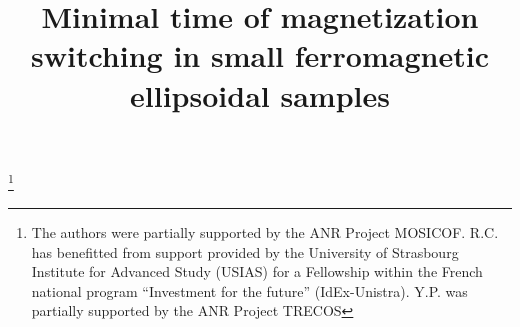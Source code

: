 \documentclass[JEP,XML,SOM,Unicode,NoEqCountersInSection,NoFloatCountersInSection,published]{cedram}
\theoremstyle{definition}
\begin{document}
\frontmatter

\title{Minimal time of magnetization switching in small ferromagnetic ellipsoidal samples}

\author[\initial{R.} \lastname{Côte}]{ }
\address{IRMA, Université de Strasbourg, CNRS UMR 7501, Inria,\\
7 rue René Descartes, 67084 Strasbourg, France\\
\& University of Strasbourg Institute for Advanced Study (USIAS)}

\author[\initial{C.} \lastname{Courtès}]{ }
\address{IRMA, Université de Strasbourg, CNRS UMR 7501, Inria,\\
7 rue René Descartes, 67084 Strasbourg, France}

\author[\initial{G.} \lastname{Ferrière}]{\nobreakauthor {}}
\address{IRMA, Université de Strasbourg, CNRS UMR 7501, Inria,\\
7 rue René Descartes, 67084 Strasbourg, France}

\author[\initial{Y.} \lastname{Privat}]{ }
\address{Université de Lorraine, CNRS, Institut Elie Cartan de Lorraine, Inria,\\
BP 70239 54506 Vandœuvre-lès-Nancy Cedex, France\\
\& Institut Universitaire de France (IUF)}

\thanks{The authors were partially supported by the ANR Project MOSICOF. R.C. has benefitted from support provided by the University of Strasbourg Institute for Advanced Study (USIAS) for a Fellowship within the French national program ``Investment for the future'' (IdEx-Unistra). Y.P. was partially supported by the ANR Project TRECOS}
\end{document}
